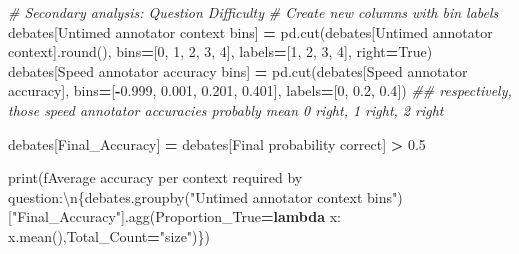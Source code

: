 \documentclass[
]{article}
\newenvironment{Shaded}{\begin{snugshade}}{\end{snugshade}}
\newcommand{\BuiltInTok}[1]{#1}
\newcommand{\CharTok}[1]{\textcolor[rgb]{0.31,0.60,0.02}{#1}}
\newcommand{\CommentTok}[1]{\textcolor[rgb]{0.56,0.35,0.01}{\textit{#1}}}
\newcommand{\DecValTok}[1]{\textcolor[rgb]{0.00,0.00,0.81}{#1}}
\newcommand{\FloatTok}[1]{\textcolor[rgb]{0.00,0.00,0.81}{#1}}
\newcommand{\KeywordTok}[1]{\textcolor[rgb]{0.13,0.29,0.53}{\textbf{#1}}}
\newcommand{\NormalTok}[1]{#1}
\newcommand{\OperatorTok}[1]{\textcolor[rgb]{0.81,0.36,0.00}{\textbf{#1}}}
\newcommand{\SpecialCharTok}[1]{\textcolor[rgb]{0.00,0.00,0.00}{#1}}
\newcommand{\SpecialStringTok}[1]{\textcolor[rgb]{0.31,0.60,0.02}{#1}}
\newcommand{\StringTok}[1]{\textcolor[rgb]{0.31,0.60,0.02}{#1}}
\newcommand{\VariableTok}[1]{\textcolor[rgb]{0.00,0.00,0.00}{#1}}
\begin{document}
\begin{Shaded}
\begin{Highlighting}[]
\CommentTok{\# Secondary analysis: Question Difficulty}
\CommentTok{\# Create new columns with bin labels}
\NormalTok{debates[}\StringTok{\textquotesingle{}Untimed annotator context bins\textquotesingle{}}\NormalTok{] }\OperatorTok{=}\NormalTok{ pd.cut(debates[}\StringTok{\textquotesingle{}Untimed annotator context\textquotesingle{}}\NormalTok{].}\BuiltInTok{round}\NormalTok{(), bins}\OperatorTok{=}\NormalTok{[}\DecValTok{0}\NormalTok{, }\DecValTok{1}\NormalTok{, }\DecValTok{2}\NormalTok{, }\DecValTok{3}\NormalTok{, }\DecValTok{4}\NormalTok{], labels}\OperatorTok{=}\NormalTok{[}\StringTok{\textquotesingle{}1\textquotesingle{}}\NormalTok{, }\StringTok{\textquotesingle{}2\textquotesingle{}}\NormalTok{, }\StringTok{\textquotesingle{}3\textquotesingle{}}\NormalTok{, }\StringTok{\textquotesingle{}4\textquotesingle{}}\NormalTok{], right}\OperatorTok{=}\VariableTok{True}\NormalTok{)}
\NormalTok{debates[}\StringTok{\textquotesingle{}Speed annotator accuracy bins\textquotesingle{}}\NormalTok{] }\OperatorTok{=}\NormalTok{ pd.cut(debates[}\StringTok{\textquotesingle{}Speed annotator accuracy\textquotesingle{}}\NormalTok{], bins}\OperatorTok{=}\NormalTok{[}\OperatorTok{{-}}\FloatTok{0.999}\NormalTok{, }\FloatTok{0.001}\NormalTok{, }\FloatTok{0.201}\NormalTok{, }\FloatTok{0.401}\NormalTok{], labels}\OperatorTok{=}\NormalTok{[}\StringTok{\textquotesingle{}0\textquotesingle{}}\NormalTok{, }\StringTok{\textquotesingle{}0.2\textquotesingle{}}\NormalTok{, }\StringTok{\textquotesingle{}0.4\textquotesingle{}}\NormalTok{])}
\CommentTok{\#\# respectively, those speed annotator accuracies probably mean 0 right, 1 right, 2 right}

\NormalTok{debates[}\StringTok{\textquotesingle{}Final\_Accuracy\textquotesingle{}}\NormalTok{] }\OperatorTok{=}\NormalTok{ debates[}\StringTok{\textquotesingle{}Final probability correct\textquotesingle{}}\NormalTok{] }\OperatorTok{\textgreater{}} \FloatTok{0.5}

\BuiltInTok{print}\NormalTok{(}\SpecialStringTok{f\textquotesingle{}Average accuracy per context required by question:}\CharTok{\textbackslash{}n}\SpecialCharTok{\{}\NormalTok{debates}\SpecialCharTok{.}\NormalTok{groupby(}\StringTok{"Untimed annotator context bins"}\NormalTok{)[}\StringTok{"Final\_Accuracy"}\NormalTok{]}\SpecialCharTok{.}\NormalTok{agg(Proportion\_True}\OperatorTok{=}\KeywordTok{lambda}\NormalTok{ x: x.mean(),Total\_Count}\OperatorTok{=}\StringTok{"size"}\NormalTok{)}\SpecialCharTok{\}}\SpecialStringTok{\textquotesingle{}}\NormalTok{)}
\end{Highlighting}
\end{Shaded}
\end{document}
